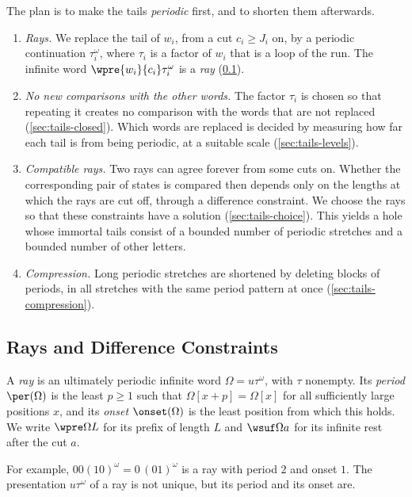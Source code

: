 The plan is to make the tails \emph{periodic} first, and to shorten them
afterwards.
\begin{enumerate}
\item \emph{Rays.} We replace the tail of $w_i$, from a cut $c_i\ge J_i$ on,
  by a periodic continuation $\tau_i^\omega$, where $\tau_i$ is a factor of
  $w_i$ that is a loop of the run. The infinite word
  $\wpre{w_i}{c_i}\tau_i^\omega$ is a \emph{ray}
  (\cref{sec:tails-rays}).
\item \emph{No new comparisons with the other words.} The factor $\tau_i$ is
  chosen so that repeating it creates no comparison with the words that are
  not replaced (\cref{sec:tails-closed}). Which words are replaced is
  decided by measuring how far each tail is from being periodic, at a
  suitable scale (\cref{sec:tails-levels}).
\item \emph{Compatible rays.} Two rays can agree forever from some cuts on.
  Whether the corresponding pair of states is compared then depends only on
  the lengths at which the rays are cut off, through a difference constraint.
  We choose the rays so that these constraints have a solution
  (\cref{sec:tails-choice}). This yields a hole whose immortal tails consist
  of a bounded number of periodic stretches and a bounded number of other
  letters.
\item \emph{Compression.} Long periodic stretches are shortened by deleting
  blocks of periods, in all stretches with the same period pattern at once
  (\cref{sec:tails-compression}).
\end{enumerate}

\subsection{Rays and Difference Constraints}\label{sec:tails-rays}

\begin{definition}[Rays]\label{def:ray}
A \emph{ray} is an ultimately periodic infinite word $\Omega=u\tau^\omega$,
with $\tau$ nonempty. Its \emph{period} $\per(\Omega)$ is the least $p\ge1$
such that $\Omega[x+p]=\Omega[x]$ for all sufficiently large positions $x$,
and its \emph{onset} $\onset(\Omega)$ is the least position from which this
holds. We write $\wpre\Omega L$ for its prefix of length $L$ and
$\wsuf\Omega a$ for its infinite rest after the cut $a$.
\end{definition}

For example, $00(10)^\omega=0\,(01)^\omega$ is a ray with period $2$ and
onset $1$. The presentation $u\tau^\omega$ of a ray is not unique, but its
period and its onset are.

